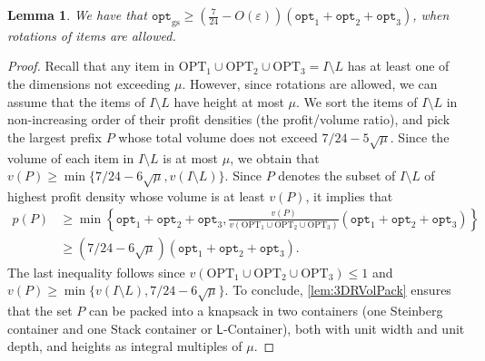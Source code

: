 \documentclass[10pt,a4paper]{amsart}
\renewcommand{\epsilon}{\varepsilon} %
\newtheorem{lemma}[theorem]{Lemma}
\theoremstyle{definition}
\newcommand{\opt}{\mathtt{opt}}
\newcommand{\optgs}{\mathtt{opt}_{\mathrm{gs}}}
\newcommand{\LContainer}{$\mathsf{L}$-Container}
\newcommand{\OPT}{\mathrm{OPT}}
\begin{document}

\begin{lemma}
\label{lem:rotationalgo}
    We have that $\optgs\ge \left(\frac{7}{24}-O(\epsilon)\right)(\opt_1+\opt_2+\opt_3)$, when rotations of items are allowed.
\end{lemma}
\begin{proof}
    Recall that any item in $\OPT_1\cup \OPT_2\cup \OPT_3=I\setminus L$ has at least one of the dimensions not exceeding $\mu$.
    However, since rotations are allowed, we can assume that the items of $I\setminus L$ have height at most $\mu$.
    We sort the items of $I\setminus L$ in non-increasing order of their profit densities (the profit/volume ratio), and
    pick the largest prefix $P$ whose total volume does not exceed $7/24-5\sqrt{\mu}$. Since the volume of each item
    in $I\setminus L$ is at most $\mu$, we obtain that $v(P)\ge \min\{7/24-6\sqrt{\mu},v(I\setminus L)\}$.
    Since $P$ denotes the subset of $I\setminus L$ of highest profit density whose volume is at least $v(P)$, it implies that
    \begin{align*}
        p(P)&\ge \min\left\{\opt_1+\opt_2+\opt_3,\frac{v(P)}{v(\OPT_1\cup\OPT_2\cup\OPT_3)}(\opt_1+\opt_2+\opt_3)\right\}\\
            &\ge (7/24-6\sqrt{\mu})(\opt_1+\opt_2+\opt_3).
    \end{align*} 
    The last inequality follows since $v(\OPT_1\cup\OPT_2\cup\OPT_3)\le 1$ and $v(P) \ge \min\{v(I\setminus L),7/24 -6\sqrt{\mu}\}$.
    To conclude, \cref{lem:3DRVolPack} ensures that the set $P$ can be packed into a knapsack in two containers (one Steinberg container and one Stack container or \LContainer),
    both with unit width and unit depth, and heights as integral multiples of $\mu$.
\end{proof}



\end{document}
